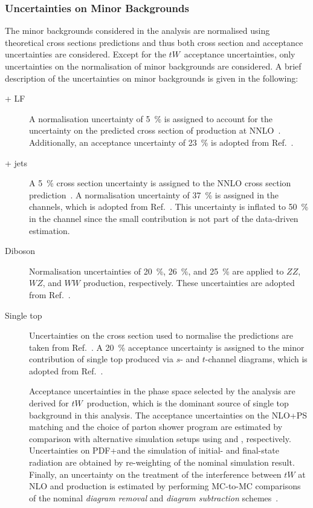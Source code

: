 \subsubsection{Uncertainties on Minor Backgrounds}

The minor backgrounds considered in the analysis are normalised using
theoretical cross sections predictions and thus both cross section and
acceptance uncertainties are considered. Except for the $tW$~acceptance
uncertainties, only uncertainties on the normalisation of minor backgrounds are
considered. A brief description of the uncertainties on minor backgrounds is
given in the following:
\begin{description}

\item[\PZ + LF] A normalisation uncertainty of \SI{5}{\percent} is assigned to
  account for the uncertainty on the predicted cross section of \Zjets
  production at NNLO~\cite{Anastasiou:2003ds}. Additionally, an acceptance
  uncertainty of \SI{23}{\percent} is adopted from Ref.~\cite{HIGG-2018-51}.

\item[\PW + jets] A \SI{5}{\percent} cross section uncertainty is assigned to
  the NNLO cross section prediction~\cite{Anastasiou:2003ds}. A normalisation
  uncertainty of \SI{37}{\percent} is assigned in the \lephad channels, which is
  adopted from Ref.~\cite{HIGG-2018-51}. This uncertainty is inflated to
  \SI{50}{\percent} in the \hadhad channel since the small \Wjets contribution
  is not part of the data-driven \faketauhadvis estimation.

\item[Diboson] Normalisation uncertainties of \SI{20}{\percent},
  \SI{26}{\percent}, and \SI{25}{\percent} are applied to $ZZ$, $WZ$, and $WW$
  production, respectively. These uncertainties are adopted from
  Ref.~\cite{HIGG-2018-51}.

\item[Single top] Uncertainties on the cross section used to normalise the
  predictions are taken from Ref.~\cite{stopxsec}. A \SI{20}{\percent}
  acceptance uncertainty is assigned to the minor contribution of single top
  produced via $s$- and $t$-channel diagrams, which is adopted from
  Ref.~\cite{HIGG-2018-51}.

  Acceptance uncertainties in the phase space selected by the analysis are
  derived for $tW$~production, which is the dominant source of single top
  background in this analysis. The acceptance uncertainties on the NLO+PS
  matching and the choice of parton shower program are estimated by comparison
  with alternative simulation setups using \MGNLO[2.6.2] and \HERWIG[7],
  respectively. Uncertainties on PDF+\alphas and the simulation of initial- and
  final-state radiation are obtained by re-weighting of the nominal simulation
  result. Finally, an uncertainty on the treatment of the interference between
  $tW$ at NLO and \ttbar production is estimated by performing MC-to-MC
  comparisons of the nominal \emph{diagram removal} and \emph{diagram
    subtraction} schemes~\cite{Frixione:2008yi}.


\end{description}
